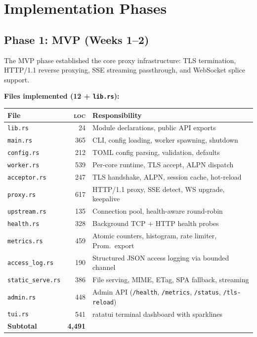 \documentclass[a4paper, 11pt]{article}
\newcommand{\loc}{\textsc{loc}}
\begin{document}
\section{Implementation Phases}

\subsection{Phase 1: MVP (Weeks 1--2)}

The MVP phase established the core proxy infrastructure: TLS termination,
HTTP/1.1 reverse proxying, SSE streaming passthrough, and WebSocket
splice support.

\textbf{Files implemented (12 + \texttt{lib.rs}):}
\begin{center}
\begin{tabular}{@{}lrl@{}}
\toprule
\textbf{File} & \textbf{\loc{}} & \textbf{Responsibility} \\
\midrule
\texttt{lib.rs}           &   24 & Module declarations, public API exports \\
\texttt{main.rs}          &  365 & CLI, config loading, worker spawning, shutdown \\
\texttt{config.rs}        &  212 & TOML config parsing, validation, defaults \\
\texttt{worker.rs}        &  539 & Per-core runtime, TLS accept, ALPN dispatch \\
\texttt{acceptor.rs}      &  247 & TLS handshake, ALPN, session cache, hot-reload \\
\texttt{proxy.rs}         &  617 & HTTP/1.1 proxy, SSE detect, WS upgrade, keepalive \\
\texttt{upstream.rs}      &  135 & Connection pool, health-aware round-robin \\
\texttt{health.rs}        &  328 & Background TCP + HTTP health probes \\
\texttt{metrics.rs}       &  459 & Atomic counters, histogram, rate limiter, Prom.\ export \\
\texttt{access\_log.rs}   &  190 & Structured JSON access logging via bounded channel \\
\texttt{static\_serve.rs} &  386 & File serving, MIME, ETag, SPA fallback, streaming \\
\texttt{admin.rs}         &  448 & Admin API (\texttt{/health}, \texttt{/metrics}, \texttt{/status}, \texttt{/tls-reload}) \\
\texttt{tui.rs}           &  541 & ratatui terminal dashboard with sparklines \\
\midrule
\textbf{Subtotal}         & \textbf{4,491} & \\
\bottomrule
\end{tabular}
\end{center}
\end{document}
